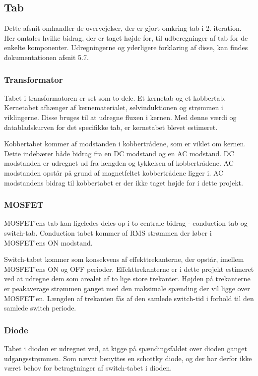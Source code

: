 \subsection{Tab} \label{tab}
Dette afsnit omhandler de overvejelser, der er gjort omkring tab i 2. iteration. Her omtales hvilke bidrag, der er taget højde for, til udberegninger af tab for de enkelte komponenter. Udregningerne og yderligere forklaring af disse, kan findes dokumentationen afsnit 5.7.

\subsubsection{Transformator}
\noindent Tabet i transformatoren er set som to dele. Et kernetab og et kobbertab. Kernetabet afhænger af  kernematerialet, selvinduktionen og strømmen i viklingerne. Disse bruges til at udregne fluxen i kernen. Med denne værdi og databladskurven for det specifikke tab, er kernetabet blevet estimeret. 

Kobbertabet kommer af modstanden i kobbertrådene, som er viklet om kernen. Dette indebærer både bidrag fra en DC modstand og en AC modstand. DC modstanden er udregnet ud fra længden og tykkelsen af kobbertrådene. AC modstanden opstår på grund af magnetfeltet kobbertrådene ligger i. AC modstandens bidrag til kobbertabet er der ikke taget højde for i dette projekt.  

\subsubsection{MOSFET}
\noindent MOSFET'ens tab kan ligeledes deles op i to centrale bidrag - conduction tab og switch-tab. Conduction tabet kommer af RMS strømmen der løber i MOSFET'ens ON modstand. 

Switch-tabet kommer som konsekvens af effekttrekanterne, der opstår, imellem MOSFET'ens ON og OFF perioder. Effekttrekanterne er i dette projekt estimeret ved at udregne dem som arealet af to lige store trekanter. Højden på trekanterne er peakaverage strømmen ganget med den maksimale spænding der vil ligge over MOSFET'en. Længden af trekanten fås af den samlede switch-tid i forhold til den samlede switch periode. 

\subsubsection{Diode}
Tabet i dioden er udregnet ved, at kigge på spændingsfaldet over dioden ganget udgangsstrømmen. Som nævnt benyttes en schottky diode, og der har derfor ikke været behov for betragtninger af switch-tabet i dioden. 
  


